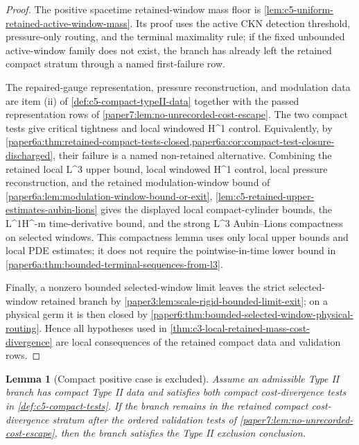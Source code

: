 \documentclass[11pt]{amsart}
\def\({}%
\def\){}%
\theoremstyle{plain}
\newtheorem{lemma}[lemma]{Lemma}
\theoremstyle{definition}
\theoremstyle{remark}
\begin{document}
\begin{proof}
The positive spacetime retained-window mass floor is
\cref{lem:c5-uniform-retained-active-window-mass}.  Its proof uses the active
CKN detection threshold, pressure-only routing, and the terminal maximality rule;
if the fixed unbounded active-window family does not exist, the branch has
already left the retained compact stratum through a named first-failure row.

The repaired-gauge representation, pressure reconstruction, and modulation data
are item \textup{(ii)} of \cref{def:c5-compact-typeII-data} together with the
passed representation rows of \cref{paper7:lem:no-unrecorded-cost-escape}.  The
two compact tests give critical tightness and local windowed \(H^1\) control.
Equivalently, by
\cref{paper6a:thm:retained-compact-tests-closed,paper6a:cor:compact-test-closure-discharged},
their failure is a named non-retained alternative.  Combining the retained local
\(L^3\) upper bound, local windowed \(H^1\) control, local pressure
reconstruction, and the retained modulation-window bound of
\cref{paper6a:lem:modulation-window-bound-or-exit},
\cref{lem:c5-retained-upper-estimates-aubin-lions} gives the displayed local
compact-cylinder bounds, the \(L^1H^{-m}\) time-derivative bound, and the
strong \(L^3\) Aubin--Lions compactness on selected windows.  This compactness
lemma uses only local upper bounds and local PDE estimates; it does not require
the pointwise-in-time lower bound in
\cref{paper6a:thm:bounded-terminal-sequences-from-l3}.

Finally, a nonzero bounded selected-window limit leaves the strict
selected-window retained branch by
\cref{paper3:lem:scale-rigid-bounded-limit-exit}; on a physical germ it is
then closed by \cref{paper6:thm:bounded-selected-window-physical-routing}.  Hence all
hypotheses used in \cref{thm:c3-local-retained-mass-cost-divergence} are local
consequences of the retained compact data and validation rows.
\end{proof}

\begin{lemma}[Compact positive case is excluded]
\label{lem:c5-compact-positive-excluded}
Assume an admissible Type II branch has compact Type II data and satisfies both
compact cost-divergence tests in \cref{def:c5-compact-tests}.  If the branch
remains in the retained compact cost-divergence stratum after the ordered
validation tests of \cref{paper7:lem:no-unrecorded-cost-escape}, then the
branch satisfies the Type II exclusion conclusion.
\end{lemma}
\end{document}
